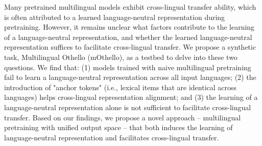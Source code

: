 Many pretrained multilingual models exhibit cross-lingual transfer ability, which is often attributed to a learned language-neutral representation during pretraining. However, it remains unclear what factors contribute to the learning of a language-neutral representation, and whether the learned language-neutral representation suffices to facilitate cross-lingual transfer. We propose a synthetic task, Multilingual Othello (mOthello), as a testbed to delve into these two questions. We find that: (1) models trained with naive multilingual pretraining fail to learn a language-neutral representation across all input languages; (2) the introduction of "anchor tokens" (i.e., lexical items that are identical across languages) helps cross-lingual representation alignment; and (3) the learning of a language-neutral representation alone is not sufficient to facilitate cross-lingual transfer. Based on our findings, we propose a novel approach -- multilingual pretraining with unified output space -- that both induces the learning of language-neutral representation and facilitates cross-lingual transfer.
